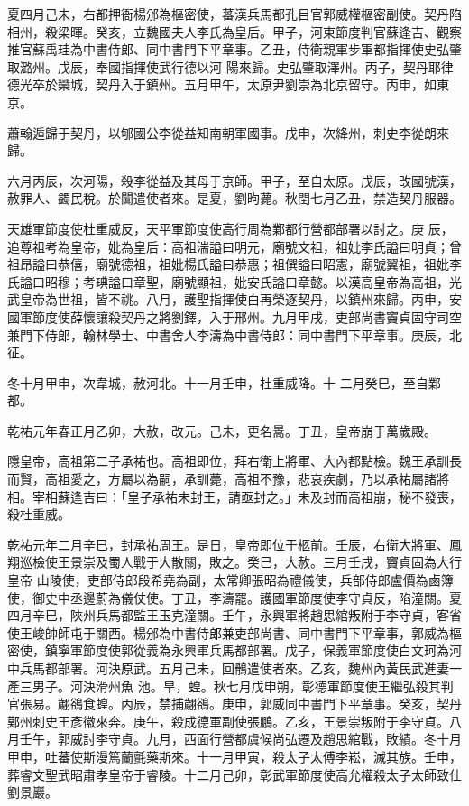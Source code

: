 \begin{pinyinscope}
 夏四月己未，右都押衙楊邠為樞密使，蕃漢兵馬都孔目官郭威權樞密副使。契丹陷相州，殺梁暉。癸亥，立魏國夫人李氏為皇后。甲子，河東節度判官蘇逢吉、觀察推官蘇禹珪為中書侍郎、同中書門下平章事。乙丑，侍衛親軍步軍都指揮使史弘肇取潞州。戊辰，奉國指揮使武行德以河
 陽來歸。史弘肇取澤州。丙子，契丹耶律德光卒於欒城，契丹入于鎮州。五月甲午，太原尹劉崇為北京留守。丙申，如東京。



 蕭翰遁歸于契丹，以郇國公李從益知南朝軍國事。戊申，次絳州，刺史李從朗來歸。



 六月丙辰，次河陽，殺李從益及其母于京師。甲子，至自太原。戊辰，改國號漢，赦罪人、蠲民稅。於闐遣使者來。是夏，劉昫薨。秋閏七月乙丑，禁造契丹服器。



 天雄軍節度使杜重威反，天平軍節度使高行周為鄴都行營都部署以討之。庚
 辰，追尊祖考為皇帝，妣為皇后：高祖湍謚曰明元，廟號文祖，祖妣李氏謚曰明貞；曾祖昂謚曰恭僖，廟號德祖，祖妣楊氏謚曰恭惠；祖僎謚曰昭憲，廟號翼祖，祖妣李氏謚曰昭穆；考琠謚曰章聖，廟號顯祖，妣安氏謚曰章懿。以漢高皇帝為高祖，光武皇帝為世祖，皆不祧。八月，護聖指揮使白再榮逐契丹，以鎮州來歸。丙申，安國軍節度使薛懷讓殺契丹之將劉鐸，入于邢州。九月甲戌，吏部尚書竇貞固守司空兼門下侍郎，翰林學士、中書舍人李濤為中書侍郎：同中書門下平章事。庚辰，北征。



 冬十月甲申，次韋城，赦河北。十一月壬申，杜重威降。十
 二月癸巳，至自鄴都。



 乾祐元年春正月乙卯，大赦，改元。己未，更名暠。丁丑，皇帝崩于萬歲殿。



 隱皇帝，高祖第二子承祐也。高祖即位，拜右衛上將軍、大內都點檢。魏王承訓長而賢，高祖愛之，方屬以為嗣，承訓薨，高祖不豫，悲哀疾劇，乃以承祐屬諸將相。宰相蘇逢吉曰：「皇子承祐未封王，請亟封之。」未及封而高祖崩，秘不發喪，殺杜重威。



 乾祐元年二月辛巳，封承祐周王。是日，皇帝即位于柩前。壬辰，右衛大將軍、鳳翔巡檢使王景崇及蜀人戰于大散關，敗之。癸巳，大赦。三月壬戌，竇貞固為大行皇帝
 山陵使，吏部侍郎段希堯為副，太常卿張昭為禮儀使，兵部侍郎盧價為鹵簿使，御史中丞邊蔚為儀仗使。丁丑，李濤罷。護國軍節度使李守貞反，陷潼關。夏四月辛巳，陜州兵馬都監王玉克潼關。壬午，永興軍將趙思綰叛附于李守貞，客省使王峻帥師屯于關西。楊邠為中書侍郎兼吏部尚書、同中書門下平章事，郭威為樞密使，鎮寧軍節度使郭從義為永興軍兵馬都部署。戊子，保義軍節度使白文珂為河中兵馬都部署。河決原武。五月己未，回鶻遣使者來。乙亥，魏州內黃民武進妻一產三男子。河決滑州魚
 池。旱，蝗。秋七月戊申朔，彰德軍節度使王繼弘殺其判官張易。翽鵒食蝗。丙辰，禁捕翽鵒。庚申，郭威同中書門下平章事。癸亥，契丹鄚州刺史王彥徽來奔。庚午，殺成德軍副使張鵬。乙亥，王景崇叛附于李守貞。八月壬午，郭威討李守貞。九月，西面行營都虞候尚弘遷及趙思綰戰，敗績。冬十月甲申，吐蕃使斯漫篤蘭氈藥斯來。十一月甲寅，殺太子太傅李崧，滅其族。壬申，葬睿文聖武昭肅孝皇帝于睿陵。十二月己卯，彰武軍節度使高允權殺太子太師致仕劉景巖。




\end{pinyinscope}
